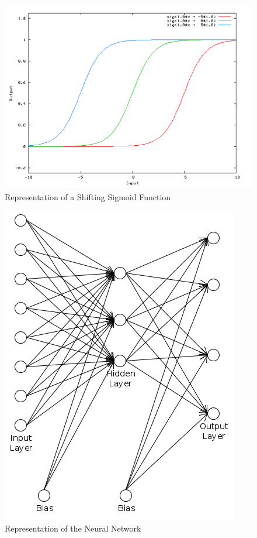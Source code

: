 \begin{figure}[h]
\begin{center}
\includegraphics[scale=0.3]{Chapter2/images/bias.png}
\caption[Representation of a Shifting Sigmoid Function]{Representation of a Shifting Sigmoid Function\footnotemark}
\label{fig:bias}
\end{center}
\end{figure}


\begin{figure}[h]
\begin{center}
\includegraphics[scale=0.3]{Chapter2/images/network.png}
\end{center}
\caption{Representation of the Neural Network}
\label{fig:ann}
\end{figure}


